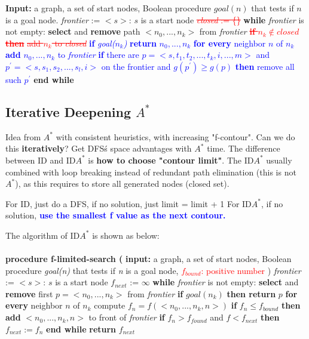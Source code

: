 \noindent
\tabto{0mm} \textbf{Input:}
\tabto{5mm} a graph,
\tabto{5mm} a set of start nodes,
\tabto{5mm} Boolean procedure $goal(n)$ that tests if $n$ is a goal node.
\tabto{0mm} \emph{frontier} := {$<s>$: $s$ is a start node}
\tabto{0mm} \textcolor{red}{\st{\emph{closed} := \{\}}}
\tabto{0mm} \textbf{while} \emph{frontier} is not empty:
\tabto{5mm} \textbf{select} and \textbf{remove} path $<n_{0},...,n_{k}>$ from \emph{frontier}
\tabto{5mm} \textcolor{red}{\st{\textbf{if} $n_{k} \notin closed$ \textbf{then}}}
\tabto{10mm} \textcolor{red}{\st{add $n_{k}$ to \emph{closed}}}
\tabto{5mm} \textcolor{blue}{\textbf{if} \emph{goal($n_{k}$)}}
\tabto{10mm} \textcolor{blue}{\textbf{return} $n_{0},...,n_{k}$}
\tabto{5mm} \textcolor{blue}{\textbf{for every} neighbor $n$ of $n_{k}$}
\tabto{10mm} \textcolor{blue}{\textbf{add} $n_{0},...,n_{k}$ to \emph{frontier}} 
\tabto{5mm} \textcolor{blue}{\textbf{if} there are $p = <s,t_{1},t_{2},...,t_{k},i,...,m>$ and $p^{\prime} = <s,s_{1},s_{2},...,s_{l},i>$ on the frontier and $g(p^{\prime}) \ge g(p)$} 
\tabto{10mm} \textcolor{blue}{\textbf{then} remove all such $p^{\prime}$} 
\tabto{0mm} \textbf{end while} \\

\subsection{Iterative Deepening $A^{*}$}
Idea from $A^{*}$ with consistent heuristics, with increasing "f-contour". Can we do this \textbf{iteratively}? Get DFS\'s space advantages with $A^{*}$ time. The difference between ID and ID$A^{*}$ is \textbf{how to choose "contour limit"}. The ID$A^{*}$ usually combined with loop breaking instead of redundant path elimination (this is not $A^{*}$), as this requires to store all generated nodes (closed set).
\begin{outline}
    \1 For ID, just do a DFS, if no solution, just limit = limit + 1
    \1 For ID$A^{*}$, if no solution, \textcolor{blue}{\textbf{use the smallest f value as the next contour.}}
\end{outline}

\noindent
The algorithm of ID$A^{*}$ is shown as below: \\ \\
\tabto{0mm} \textbf{procedure f-limited-search (}
\tabto{5mm} \textbf{input:} a graph,
\tabto{5mm} a set of start nodes,
\tabto{5mm} Boolean procedure \emph{goal(n)} that tests if \emph{n} is a goal node,
\tabto{5mm} \textcolor{red}{$f_{bound}$: positive number}
\tabto{0mm} )
\tabto{0mm} \emph{frontier} := {$<s>$: $s$ is a start node}
\tabto{0mm} $f_{next}$ := $\infty$
\tabto{0mm} \textbf{while} \emph{frontier} is not empty:
\tabto{5mm} \textbf{select} and \textbf{remove} first $p = <n_{0},...,n_{k}>$ from \emph{frontier}
\tabto{10mm} \textbf{if} $goal(n_{k})$ \textbf{then return} $p$
\tabto{10mm} \textbf{for every} neighbor $n$ of $n_{k}$
\tabto{15mm} compute $f_{n} = f(<n_{0},...,n_{k},n>)$
\tabto{15mm} \textbf{if} $f_{n} \le f_{bound}$
\tabto{20mm} \textbf{then add} $<n_{0},...,n_{k},n>$ to front of \emph{frontier}
\tabto{15mm} \textbf{if} $f_{n} > f_{found}$ and $f < f_{next}$
\tabto{20mm} \textbf{then} $f_{next} := f_{n}$
\tabto{0mm} \textbf{end while}
\tabto{0mm} \textbf{return} $f_{next}$

